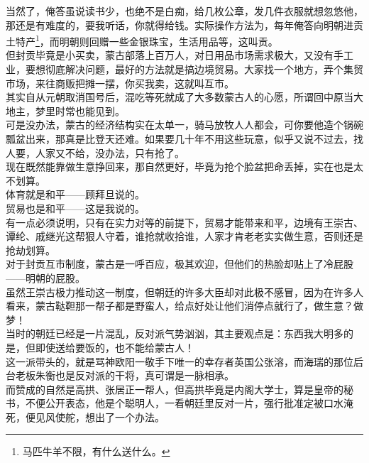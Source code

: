 \begin{multicols}{\theparacolNo}
当然了，俺答虽说读书少，也绝不是白痴，给几枚公章，发几件衣服就想忽悠他，那还是有难度的，要我听话，你就得给钱。实际操作方法为，每年俺答向明朝进贡土特产\footnote{马匹牛羊不限，有什么送什么。}，而明朝则回赠一些金银珠宝，生活用品等，这叫贡。\\

但封贡毕竟是小买卖，蒙古部落上百万人，对日用品市场需求极大，又没有手工业，要想彻底解决问题，最好的方法就是搞边境贸易。大家找一个地方，弄个集贸市场，来往商贩把摊一摆，你买我卖，这就叫互市。\\

其实自从元朝取消国号后，混吃等死就成了大多数蒙古人的心愿，所谓回中原当大地主，梦里时常也能见到。\\

可是没办法，蒙古的经济结构实在太单一，骑马放牧人人都会，可你要他造个锅碗瓢盆出来，那真是比登天还难。如果要几十年不用这些玩意，似乎又说不过去，找人要，人家又不给，没办法，只有抢了。\\

现在既然能靠做生意挣回来，那自然更好，毕竟为抢个脸盆把命丢掉，实在也是太不划算。\\

体育就是和平——顾拜旦说的。\\

贸易也是和平——这是我说的。\\

有一点必须说明，只有在实力对等的前提下，贸易才能带来和平，边境有王崇古、谭纶、戚继光这帮狠人守着，谁抢就收拾谁，人家才肯老老实实做生意，否则还是抢劫划算。\\

对于封贡互市制度，蒙古是一呼百应，极其欢迎，但他们的热脸却贴上了冷屁股——明朝的屁股。\\

虽然王崇古极力推动这一制度，但朝廷的许多大臣却对此极不感冒，因为在许多人看来，蒙古鞑靼那一帮子都是野蛮人，给点好处让他们消停点就行了，做生意？做梦！\\

当时的朝廷已经是一片混乱，反对派气势汹汹，其主要观点是：东西我大明多的是，但即使送给要饭的，也不能给蒙古人！\\

这一派带头的，就是骂神欧阳一敬手下唯一的幸存者英国公张溶，而海瑞的那位后台老板朱衡也是反对派的干将，真可谓是一脉相承。\\

而赞成的自然是高拱、张居正一帮人，但高拱毕竟是内阁大学士，算是皇帝的秘书，不便公开表态，他是个聪明人，一看朝廷里反对一片，强行批准定被口水淹死，便见风使舵，想出了一个办法。\\


\end{multicols}
